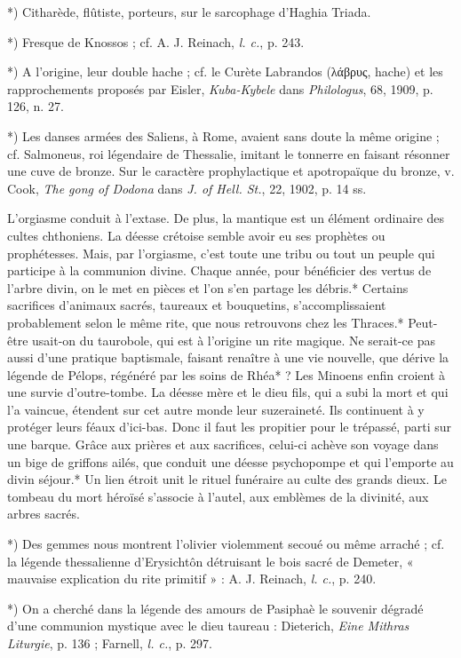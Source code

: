 \documentclass[a4paper, 11pt, oneside, polutonikogreek, french]{article}
\begin{document}
*) Citharède, flûtiste, porteurs, sur le sarcophage d'Haghia Triada.

*) Fresque de Knossos ; cf. A. J. Reinach, \emph{l. c.}, p. 243.

*) A l'origine, leur double hache ; cf. le Curète Labrandos (λάβρυς, hache) et les rapprochements proposés par Eisler, \emph{Kuba-Kybele} dans \emph{Philologus}, 68, 1909, p. 126, n. 27.

*) Les danses armées des Saliens, à Rome, avaient sans doute la même origine ; cf. Salmoneus, roi légendaire de Thessalie, imitant le tonnerre en faisant résonner une cuve de bronze. Sur le caractère prophylactique et apotropaïque du bronze, v. Cook, \emph{The gong of Dodona} dans \emph{J. of Hell. St.}, 22, 1902, p. 14 ss.

L'orgiasme conduit à l'extase. De plus, la mantique est un élément ordinaire des cultes chthoniens. La déesse crétoise semble avoir eu ses prophètes ou prophétesses. Mais, par l'orgiasme, c'est toute une tribu ou tout un peuple qui participe à la communion divine. Chaque année, pour bénéficier des vertus de l'arbre divin, on le met en pièces et l'on s'en partage les débris.* Certains sacrifices d'animaux sacrés, taureaux et bouquetins, s'accomplissaient probablement selon le même rite, que nous retrouvons chez les Thraces.* Peut-être usait-on du taurobole, qui est à l'origine un rite magique. Ne serait-ce pas aussi d'une pratique baptismale, faisant renaître à une vie nouvelle, que dérive la légende de Pélops, régénéré par les soins de Rhéa* ? Les Minoens enfin croient à une survie d'outre-tombe. La déesse mère et le dieu fils, qui a subi la mort et qui l'a vaincue, étendent sur cet autre monde leur suzeraineté. Ils continuent à y protéger leurs féaux d'ici-bas. Donc il faut les propitier pour le trépassé, parti sur une barque. Grâce aux prières et aux sacrifices, celui-ci achève son voyage dans un bige de griffons ailés, que conduit une déesse psychopompe et qui l'emporte au divin séjour.* Un lien étroit unit le rituel funéraire au culte des grands dieux. Le tombeau du mort héroïsé s'associe à l'autel, aux emblèmes de la divinité, aux arbres sacrés.

*) Des gemmes nous montrent l'olivier violemment secoué ou même arraché ; cf. la légende thessalienne d'Erysichtôn détruisant le bois sacré de Demeter, « mauvaise explication du rite primitif » : A. J. Reinach, \emph{l. c.}, p. 240.

*) On a cherché dans la légende des amours de Pasiphaè le souvenir dégradé d'une communion mystique avec le dieu taureau : Dieterich, \emph{Eine Mithras Liturgie}, p. 136 ; Farnell, \emph{l. c.}, p. 297.
\end{document}
